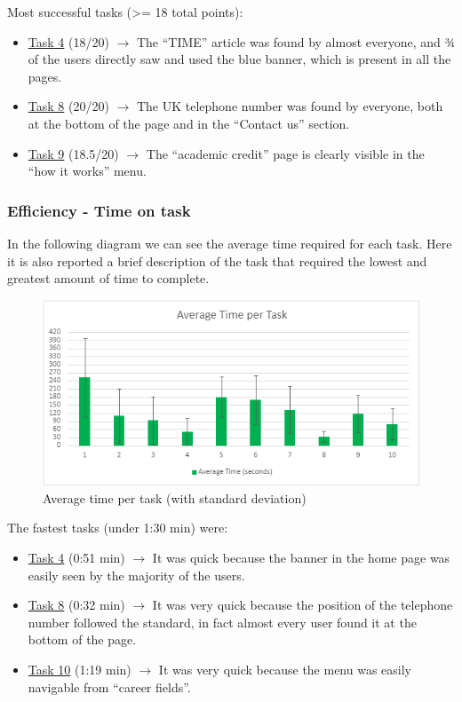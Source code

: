 \documentclass[11pt, letterpaper]{article}
\begin{document}
Most successful tasks (>= 18 total points): 
\begin{itemize}
    \item \hyperref[Task:04]{Task 4} (18/20) $\rightarrow$ The “TIME” article was found by almost everyone, and ¾ of the users directly saw and used the blue banner, which is present in all the pages.
    \item \hyperref[Task:08]{Task 8} (20/20) $\rightarrow$ The UK telephone number was found by everyone, both at the bottom of the page and in the “Contact us” section. 
    \item \hyperref[Task:09]{Task 9} (18.5/20) $\rightarrow$ The “academic credit” page is clearly visible in the “how it works” menu. 
\end{itemize}

\subsubsection{Efficiency - Time on task}
In the following diagram we can see the average time required for each task. Here it is also reported a brief description of the task that required the lowest and greatest amount of time to complete. \\
\begin{figure}[H]
    \centering
    \includegraphics[width=.6\textwidth]{images/user testing/average_time_per_task_with_var.png}
    \caption{Average time per task (with standard deviation)}
    \label{fig:time_per_task}
\end{figure}
\noindent
The fastest tasks (under 1:30 min) were: 
\begin{itemize}
    \item \hyperref[Task:04]{Task 4} (0:51 min) $\rightarrow$ It was quick because the banner in the home page was easily seen by the majority of the users. 
    \item \hyperref[Task:08]{Task 8} (0:32 min) $\rightarrow$ It was very quick because the position of the telephone number followed the standard, in fact almost every user found it at the bottom of the page. 
    \item \hyperref[Task:10]{Task 10} (1:19 min) $\rightarrow$ It was very quick because the menu was easily navigable from “career fields”.
\end{itemize} 
\end{document}
